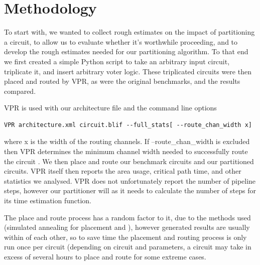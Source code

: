 \documentclass[12pt,drafta4paper,oneside]{memoir} %
\begin{document}
{

\section{Methodology}
To start with, we wanted to collect rough estimates on the impact of partitioning a circuit, to allow us to evaluate whether it's worthwhile proceeding, and to develop the rough estimates needed for our partitioning algorithm. To that end we first created a simple Python script to take an arbitrary input circuit, triplicate it, and insert arbitrary voter logic. These triplicated circuits were then placed and routed by \ac{VPR}, as were the original benchmarks, and the results compared.

\ac{VPR} is used with our architecture file  and the command line options 
\begin{lstlisting}
VPR architecture.xml circuit.blif --full_stats[ --route_chan_width x]
\end{lstlisting} where x is the width of the routing channels.
If --route\_chan\_width is excluded then \ac{VPR} determines the minimum channel width needed to successfully route the circuit . We then place and route our benchmark circuits and our partitioned circuits. \ac{VPR} itself then reports the area usage, critical path time, and other statistics we analysed. \ac{VPR} does not unfortunately report the number of pipeline steps, however our partitioner will as it needs to calculate the number of steps for its time estimation function.

The place and route process has a random factor to it, due to the methods used (simulated annealing for placement  and ), however generated results are usually within  of each other, so to save time the placement and routing process is only run once per circuit (depending on circuit and parameters, a circuit may take in excess of several hours to place and route for some extreme cases.
}
\end{document}
